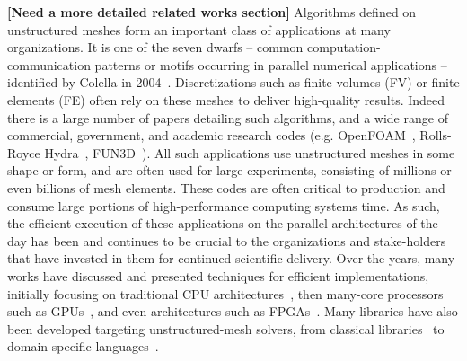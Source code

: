 \noindent \textbf{[Need a more detailed related works section]}
Algorithms defined on unstructured meshes form an important 
class of applications at many organizations. It is one of the seven dwarfs -- 
common computation-communication patterns or motifs occurring in parallel 
numerical applications -- identified by Colella in 2004~\cite{Colella2004}. 
Discretizations such as finite volumes (FV) or finite elements (FE) often rely 
on these meshes to deliver high-quality results. Indeed there is a large number 
of papers detailing such algorithms, and a wide range of commercial, government, 
and academic research codes (e.g. OpenFOAM~\cite{OpenFoamUserGuide}, Rolls-Royce 
Hydra~\cite{moinier2002edge}, FUN3D~\cite{biedron2017fun3d}). All such 
applications use unstructured meshes in some shape or form, and are often used 
for large experiments, consisting of millions or even billions of mesh elements. 
These codes are often critical to production and consume large portions of 
high-performance computing systems time. As such, the efficient execution of 
these applications on the parallel architectures of the day has been and 
continues to be crucial to the organizations and stake-holders that have 
invested in them for continued scientific delivery. Over the years, many works 
have discussed and presented techniques for efficient implementations, initially 
focusing on traditional CPU architectures~\cite{mavriplis2002parallel, 
jin1999openmp}, then many-core processors such as GPUs~\cite{GPU-papers}, and 
even architectures such as FPGAs~\cite{nagy2014accelerating, 
akamine2012reconfigurable}. Many libraries have also been developed targeting 
unstructured-mesh solvers, from classical libraries~\cite{trilinos, PETSc, 
libocca, other-classical-libs} to domain specific 
languages~\cite{devito2011liszt, giles2012op2, pyfr2016}. 

